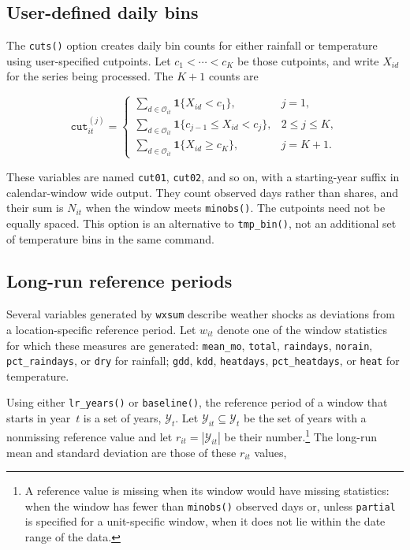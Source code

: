 \subsection{User-defined daily bins}

The \texttt{cuts()} option creates daily bin counts for either rainfall or temperature using user-specified cutpoints. Let $c_1 < \cdots < c_K$ be those cutpoints, and write $X_{id}$ for the series being processed. The $K + 1$ counts are

\begin{equation}
	\texttt{cut}_{it}^{(j)} =
	\begin{cases}
		\displaystyle \sum_{d \in \mathcal{O}_{it}} \mathbf{1}\{X_{id} < c_1\} , & j = 1 , \\[8pt]
		\displaystyle \sum_{d \in \mathcal{O}_{it}} \mathbf{1}\{c_{j - 1} \leq X_{id} < c_j\} , & 2 \leq j \leq K , \\[8pt]
		\displaystyle \sum_{d \in \mathcal{O}_{it}} \mathbf{1}\{X_{id} \geq c_K\} , & j = K + 1 .
	\end{cases}
\end{equation}

\noindent These variables are named \texttt{cut01}, \texttt{cut02}, and so on, with a starting-year suffix in calendar-window wide output. They count observed days rather than shares, and their sum is $N_{it}$ when the window meets \texttt{minobs()}. The cutpoints need not be equally spaced. This option is an alternative to \texttt{tmp\_bin()}, not an additional set of temperature bins in the same command.

\subsection{Long-run reference periods}

Several variables generated by \texttt{wxsum} describe weather shocks as deviations from a location-specific reference period. Let $w_{it}$ denote one of the window statistics for which these measures are generated: \texttt{mean\_mo}, \texttt{total}, \texttt{raindays}, \texttt{norain}, \texttt{pct\_raindays}, or \texttt{dry} for rainfall; \texttt{gdd}, \texttt{kdd}, \texttt{heatdays}, \texttt{pct\_heatdays}, or \texttt{heat} for temperature.

Using either \texttt{lr\_years()} or \texttt{baseline()}, the reference period of a window that starts in year~$t$ is a set of years, $\mathcal{Y}_t$. Let $\mathcal{Y}_{it} \subseteq \mathcal{Y}_t$ be the set of years with a nonmissing reference value and let $r_{it} = |\mathcal{Y}_{it}|$ be their number.\footnote{A reference value is missing when its window would have missing statistics: when the window has fewer than \texttt{minobs()} observed days or, unless \texttt{partial} is specified for a unit-specific window, when it does not lie within the date range of the data. }  The long-run mean and standard deviation are those of these $r_{it}$ values,

